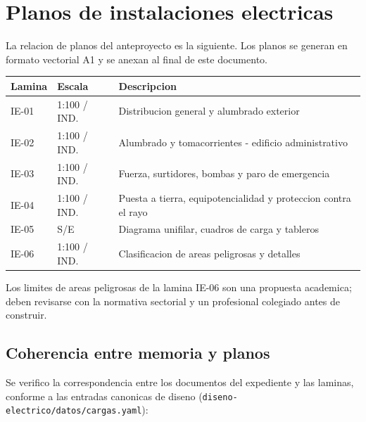 \chapter{Planos de instalaciones electricas}

La relacion de planos del anteproyecto es la siguiente. Los planos se generan
en formato vectorial A1 y se anexan al final de este documento.

\begin{center}
\begin{tabularx}{\linewidth}{@{}l l L@{}}
\toprule
Lamina & Escala & Descripcion \\
\midrule
IE-01 & 1:100 / IND. & Distribucion general y alumbrado exterior \\
IE-02 & 1:100 / IND. & Alumbrado y tomacorrientes - edificio administrativo \\
IE-03 & 1:100 / IND. & Fuerza, surtidores, bombas y paro de emergencia \\
IE-04 & 1:100 / IND. & Puesta a tierra, equipotencialidad y proteccion contra el rayo \\
IE-05 & S/E & Diagrama unifilar, cuadros de carga y tableros \\
IE-06 & 1:100 / IND. & Clasificacion de areas peligrosas y detalles \\
\bottomrule
\end{tabularx}
\end{center}

Los limites de areas peligrosas de la lamina IE-06 son una propuesta
academica; deben revisarse con la normativa sectorial y un profesional
colegiado antes de construir.

\section{Coherencia entre memoria y planos}
Se verifico la correspondencia entre los documentos del expediente y las
laminas, conforme a las entradas canonicas de diseno
(\texttt{diseno-electrico/datos/cargas.yaml}):

